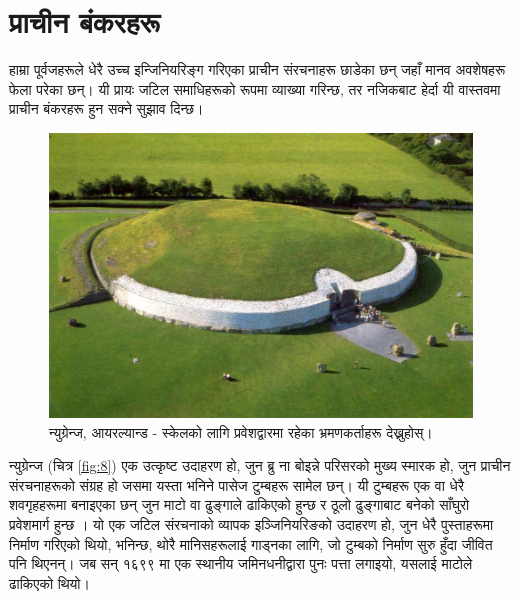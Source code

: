 \documentclass[10pt,twocolumn,letterpaper]{article}
\begin{document}
\section{प्राचीन बंकरहरू}

हाम्रा पूर्वजहरूले धेरै उच्च इन्जिनियरिङ्ग गरिएका प्राचीन संरचनाहरू छाडेका छन् जहाँ मानव अवशेषहरू फेला परेका छन्। यी प्रायः जटिल समाधिहरूको रूपमा व्याख्या गरिन्छ, तर नजिकबाट हेर्दा यी वास्तवमा प्राचीन बंकरहरू हुन सक्ने सुझाव दिन्छ।

\begin{figure}[b]
\begin{center}
   \includegraphics[width=1\linewidth]{ww19.jpg}
\end{center}
   \caption{न्युग्रेन्ज, आयरल्यान्ड - स्केलको लागि प्रवेशद्वारमा रहेका भ्रमणकर्ताहरू देख्नुहोस्।}
\label{fig:8}
\label{fig:onecol}
\end{figure}

न्युग्रेन्ज (चित्र \ref{fig:8}) एक उत्कृष्ट उदाहरण हो, जुन ब्रु ना बोइन्ने परिसरको मुख्य स्मारक हो, जुन प्राचीन संरचनाहरूको संग्रह हो जसमा यस्ता भनिने पासेज टुम्बहरू सामेल छन्। यी टुम्बहरू एक वा धेरै शवगृहहरूमा बनाइएका छन् जुन माटो वा ढुङ्गाले ढाकिएको हुन्छ र ठूलो ढुङ्गाबाट बनेको साँघुरो प्रवेशमार्ग हुन्छ \cite{70}। यो एक जटिल संरचनाको व्यापक इञ्जिनियरिङको उदाहरण हो, जुन धेरै पुस्ताहरूमा निर्माण गरिएको थियो, भनिन्छ, थोरै मानिसहरूलाई गाड्नका लागि, जो टुम्बको निर्माण सुरु हुँदा जीवित पनि थिएनन्। जब सन् १६९९ मा एक स्थानीय जमिनधनीद्वारा पुनः पत्ता लगाइयो, यसलाई माटोले ढाकिएको थियो।
\end{document}
